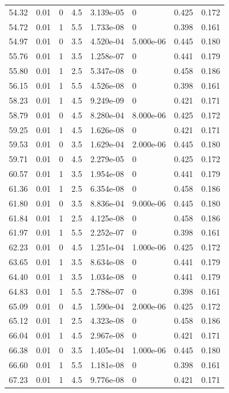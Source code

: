 \documentclass[preview]{standalone}
\begin{document}
{{{{\begin{tabular}{L{1.2cm}C{1.2cm} C{0.3cm}C{0.5cm} C{1.4cm}C{1.4cm} C{1.4cm}C{1.4cm}}
  54.32  &  0.01  & 0     & 4.5 &  3.139e-05  & 0  & 0.425 &  0.172   \\ 
  54.72  &  0.01  & 1     & 5.5 &  1.733e-08  & 0  & 0.398 &  0.161   \\ 
  54.97  &  0.01  & 0     & 3.5 &  4.520e-04  & 5.000e-06  & 0.445 &  0.180   \\ 
  55.76  &  0.01  & 1     & 3.5 &  1.258e-07  & 0  & 0.441 &  0.179   \\ 
  55.80  &  0.01  & 1     & 2.5 &  5.347e-08  & 0  & 0.458 &  0.186   \\ 
  56.15  &  0.01  & 1     & 5.5 &  4.526e-08  & 0  & 0.398 &  0.161   \\ 
  58.23  &  0.01  & 1     & 4.5 &  9.249e-09  & 0  & 0.421 &  0.171   \\ 
  58.79  &  0.01  & 0     & 4.5 &  8.280e-04  & 8.000e-06  & 0.425 &  0.172   \\ 
  59.25  &  0.01  & 1     & 4.5 &  1.626e-08  & 0  & 0.421 &  0.171   \\ 
  59.53  &  0.01  & 0     & 3.5 &  1.629e-04  & 2.000e-06  & 0.445 &  0.180   \\ 
  59.71  &  0.01  & 0     & 4.5 &  2.279e-05  & 0  & 0.425 &  0.172   \\ 
  60.57  &  0.01  & 1     & 3.5 &  1.954e-08  & 0  & 0.441 &  0.179   \\ 
  61.36  &  0.01  & 1     & 2.5 &  6.354e-08  & 0  & 0.458 &  0.186   \\ 
  61.80  &  0.01  & 0     & 3.5 &  8.836e-04  & 9.000e-06  & 0.445 &  0.180   \\ 
  61.84  &  0.01  & 1     & 2.5 &  4.125e-08  & 0  & 0.458 &  0.186   \\ 
  61.97  &  0.01  & 1     & 5.5 &  2.252e-07  & 0  & 0.398 &  0.161   \\ 
  62.23  &  0.01  & 0     & 4.5 &  1.251e-04  & 1.000e-06  & 0.425 &  0.172   \\ 
  63.65  &  0.01  & 1     & 3.5 &  8.634e-08  & 0  & 0.441 &  0.179   \\ 
  64.40  &  0.01  & 1     & 3.5 &  1.034e-08  & 0  & 0.441 &  0.179   \\ 
  64.83  &  0.01  & 1     & 5.5 &  2.788e-07  & 0  & 0.398 &  0.161   \\ 
  65.09  &  0.01  & 0     & 4.5 &  1.590e-04  & 2.000e-06  & 0.425 &  0.172   \\ 
  65.12  &  0.01  & 1     & 2.5 &  4.323e-08  & 0  & 0.458 &  0.186   \\ 
  66.04  &  0.01  & 1     & 4.5 &  2.967e-08  & 0  & 0.421 &  0.171   \\ 
  66.38  &  0.01  & 0     & 3.5 &  1.405e-04  & 1.000e-06  & 0.445 &  0.180   \\ 
  66.60  &  0.01  & 1     & 5.5 &  1.181e-08  & 0  & 0.398 &  0.161   \\ 
  67.23  &  0.01  & 1     & 4.5 &  9.776e-08  & 0  & 0.421 &  0.171   \\ 
\hline 
\end{tabular} 

}}}}
\end{document}

